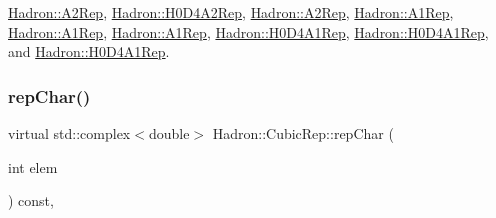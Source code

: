 \mbox{\hyperlink{structHadron_1_1A2Rep_a31e1135ddb204394f1c6153797a7dffa}{Hadron\+::\+A2\+Rep}}, \mbox{\hyperlink{structHadron_1_1H0D4A2Rep_ad23c66fe369200d0ff8bebcabf8dfc62}{Hadron\+::\+H0\+D4\+A2\+Rep}}, \mbox{\hyperlink{structHadron_1_1A2Rep_a31e1135ddb204394f1c6153797a7dffa}{Hadron\+::\+A2\+Rep}}, \mbox{\hyperlink{structHadron_1_1A1Rep_a6b592d902063cfea9bd1cedcdeb9ac79}{Hadron\+::\+A1\+Rep}}, \mbox{\hyperlink{structHadron_1_1A1Rep_a6b592d902063cfea9bd1cedcdeb9ac79}{Hadron\+::\+A1\+Rep}}, \mbox{\hyperlink{structHadron_1_1A1Rep_a6b592d902063cfea9bd1cedcdeb9ac79}{Hadron\+::\+A1\+Rep}}, \mbox{\hyperlink{structHadron_1_1H0D4A1Rep_afbedc9857e7215106a2225ff351ada68}{Hadron\+::\+H0\+D4\+A1\+Rep}}, \mbox{\hyperlink{structHadron_1_1H0D4A1Rep_afbedc9857e7215106a2225ff351ada68}{Hadron\+::\+H0\+D4\+A1\+Rep}}, and \mbox{\hyperlink{structHadron_1_1H0D4A1Rep_afbedc9857e7215106a2225ff351ada68}{Hadron\+::\+H0\+D4\+A1\+Rep}}.

\mbox{\label{structHadron_1_1CubicRep_af45227106e8e715e84b0af69cd3b36f8}} 
\subsubsection{\texorpdfstring{repChar()}{repChar()}\hspace{0.1cm}{\footnotesize\ttfamily [1/3]}}
{\footnotesize\ttfamily virtual std\+::complex$<$double$>$ Hadron\+::\+Cubic\+Rep\+::rep\+Char (\begin{DoxyParamCaption}\item[{int}]{elem }\end{DoxyParamCaption}) const\hspace{0.3cm}{\ttfamily [inline]}, {\ttfamily [virtual]}}




